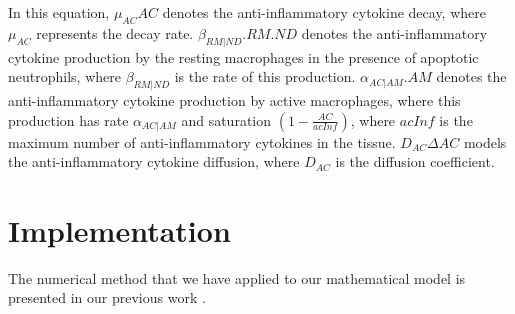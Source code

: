 \documentclass[10pt]{bmc_article}
\newenvironment{bmcformat}{\baselineskip20pt\sloppy\setboolean{publ}{false}}{\baselineskip20pt\sloppy}
\begin{document}
\begin{bmcformat}
In this equation, $\mu_{AC} AC$ denotes the anti-inflammatory cytokine decay, where $\mu_{AC}$ represents the decay rate. 
$\beta _{RM|ND}.RM.ND$ denotes the anti-inflammatory cytokine production by the resting macrophages in the presence of apoptotic 
neutrophils, where $\beta _{RM|ND}$ is the rate of this production. 
$\alpha _{AC|AM}.AM$ denotes the anti-inflammatory cytokine production by active macrophages, where this production has 
rate $\alpha _{AC|AM}$ and saturation $(1 - \frac{AC}{acInf})$, where $acInf$ is the maximum number of anti-inflammatory cytokines 
in the tissue. $D_{AC} \Delta AC$ models the anti-inflammatory cytokine diffusion, where $D_{AC}$ is the diffusion coefficient.


\section*{Implementation}\label{implementation}

The numerical method that we have applied to our mathematical model is presented in our previous work \cite{icaris11}.

% 
% 


\end{bmcformat}
\end{document}
